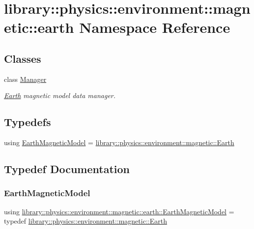 \hypertarget{namespacelibrary_1_1physics_1_1environment_1_1magnetic_1_1earth}{}\section{library\+:\+:physics\+:\+:environment\+:\+:magnetic\+:\+:earth Namespace Reference}
\label{namespacelibrary_1_1physics_1_1environment_1_1magnetic_1_1earth}
\subsection*{Classes}
\begin{DoxyCompactItemize}
\item 
class \hyperlink{classlibrary_1_1physics_1_1environment_1_1magnetic_1_1earth_1_1_manager}{Manager}
\begin{DoxyCompactList}\small\item\em \hyperlink{classlibrary_1_1physics_1_1environment_1_1magnetic_1_1_earth}{Earth} magnetic model data manager. \end{DoxyCompactList}\end{DoxyCompactItemize}
\subsection*{Typedefs}
\begin{DoxyCompactItemize}
\item 
using \hyperlink{namespacelibrary_1_1physics_1_1environment_1_1magnetic_1_1earth_a09dfd221a5ce119273cfd1123e51faf4}{Earth\+Magnetic\+Model} = \hyperlink{classlibrary_1_1physics_1_1environment_1_1magnetic_1_1_earth}{library\+::physics\+::environment\+::magnetic\+::\+Earth}
\end{DoxyCompactItemize}


\subsection{Typedef Documentation}
\mbox{\label{namespacelibrary_1_1physics_1_1environment_1_1magnetic_1_1earth_a09dfd221a5ce119273cfd1123e51faf4}} 
\subsubsection{\texorpdfstring{Earth\+Magnetic\+Model}{EarthMagneticModel}}
{\footnotesize\ttfamily using \hyperlink{namespacelibrary_1_1physics_1_1environment_1_1magnetic_1_1earth_a09dfd221a5ce119273cfd1123e51faf4}{library\+::physics\+::environment\+::magnetic\+::earth\+::\+Earth\+Magnetic\+Model} = typedef \hyperlink{classlibrary_1_1physics_1_1environment_1_1magnetic_1_1_earth}{library\+::physics\+::environment\+::magnetic\+::\+Earth}}

